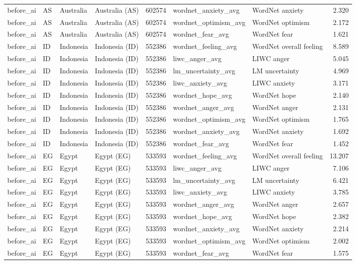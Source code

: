 \begin{tabular}{llllrllr}
before\_ai & AS & Australia & Australia (AS) & 602574 & wordnet\_anxiety\_avg & WordNet anxiety & 2.320 \\
before\_ai & AS & Australia & Australia (AS) & 602574 & wordnet\_optimism\_avg & WordNet optimism & 2.172 \\
before\_ai & AS & Australia & Australia (AS) & 602574 & wordnet\_fear\_avg & WordNet fear & 1.621 \\
before\_ai & ID & Indonesia & Indonesia (ID) & 552386 & wordnet\_feeling\_avg & WordNet overall feeling & 8.589 \\
before\_ai & ID & Indonesia & Indonesia (ID) & 552386 & liwc\_anger\_avg & LIWC anger & 5.045 \\
before\_ai & ID & Indonesia & Indonesia (ID) & 552386 & lm\_uncertainty\_avg & LM uncertainty & 4.969 \\
before\_ai & ID & Indonesia & Indonesia (ID) & 552386 & liwc\_anxiety\_avg & LIWC anxiety & 3.171 \\
before\_ai & ID & Indonesia & Indonesia (ID) & 552386 & wordnet\_hope\_avg & WordNet hope & 2.140 \\
before\_ai & ID & Indonesia & Indonesia (ID) & 552386 & wordnet\_anger\_avg & WordNet anger & 2.131 \\
before\_ai & ID & Indonesia & Indonesia (ID) & 552386 & wordnet\_optimism\_avg & WordNet optimism & 1.765 \\
before\_ai & ID & Indonesia & Indonesia (ID) & 552386 & wordnet\_anxiety\_avg & WordNet anxiety & 1.692 \\
before\_ai & ID & Indonesia & Indonesia (ID) & 552386 & wordnet\_fear\_avg & WordNet fear & 1.452 \\
before\_ai & EG & Egypt & Egypt (EG) & 533593 & wordnet\_feeling\_avg & WordNet overall feeling & 13.207 \\
before\_ai & EG & Egypt & Egypt (EG) & 533593 & liwc\_anger\_avg & LIWC anger & 7.106 \\
before\_ai & EG & Egypt & Egypt (EG) & 533593 & lm\_uncertainty\_avg & LM uncertainty & 6.421 \\
before\_ai & EG & Egypt & Egypt (EG) & 533593 & liwc\_anxiety\_avg & LIWC anxiety & 3.785 \\
before\_ai & EG & Egypt & Egypt (EG) & 533593 & wordnet\_anger\_avg & WordNet anger & 2.657 \\
before\_ai & EG & Egypt & Egypt (EG) & 533593 & wordnet\_hope\_avg & WordNet hope & 2.382 \\
before\_ai & EG & Egypt & Egypt (EG) & 533593 & wordnet\_anxiety\_avg & WordNet anxiety & 2.214 \\
before\_ai & EG & Egypt & Egypt (EG) & 533593 & wordnet\_optimism\_avg & WordNet optimism & 2.002 \\
before\_ai & EG & Egypt & Egypt (EG) & 533593 & wordnet\_fear\_avg & WordNet fear & 1.575 \\
\bottomrule
\end{tabular}
